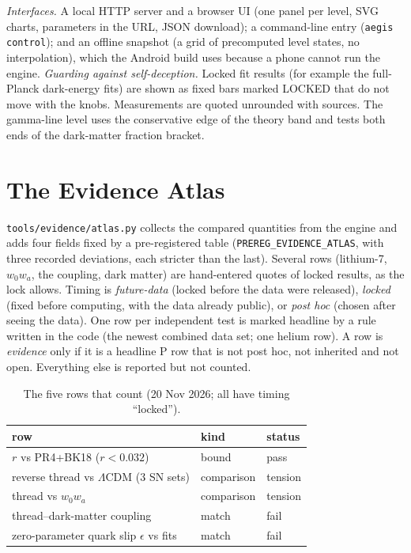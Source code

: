 \documentclass[aps,prd,twocolumn,superscriptaddress,nofootinbib,showkeys]{revtex4-2}
\begin{document}
\textit{Interfaces.} A local HTTP server and a browser UI (one panel per level, SVG charts, parameters in the URL, JSON download); a command-line entry (\texttt{aegis control}); and an offline snapshot (a grid of precomputed level states, no interpolation), which the Android build uses because a phone cannot run the engine.
\textit{Guarding against self-deception.} Locked fit results (for example the full-Planck dark-energy fits) are shown as fixed bars marked LOCKED that do not move with the knobs. Measurements are quoted unrounded with sources. The gamma-line level uses the conservative edge of the theory band and tests both ends of the dark-matter fraction bracket.

\section{The Evidence Atlas}
\texttt{tools/evidence/atlas.py} collects the compared quantities from the engine and adds four fields fixed by a pre-registered table (\texttt{PREREG\_EVIDENCE\_ATLAS}, with three recorded deviations, each stricter than the last). Several rows (lithium-7, $w_0w_a$, the coupling, dark matter) are hand-entered quotes of locked results, as the lock allows. Timing is \emph{future-data} (locked before the data were released), \emph{locked} (fixed before computing, with the data already public), or \emph{post hoc} (chosen after seeing the data). One row per independent test is marked headline by a rule written in the code (the newest combined data set; one helium row). A row is \emph{evidence} only if it is a headline P row that is not post hoc, not inherited and not open. Everything else is reported but not counted.
\begin{table}[t]
\caption{\label{tab:ev}The five rows that count (20 Nov 2026; all have timing ``locked'').}
\begin{ruledtabular}\begin{tabular}{lll}
row & kind & status\\ \hline
$r$ vs PR4+BK18 ($r<0.032$) & bound & pass\\
reverse thread vs $\Lambda$CDM (3 SN sets) & comparison & tension\\
thread vs $w_0w_a$ & comparison & tension\\
thread--dark-matter coupling & match & fail\\
zero-parameter quark slip $\epsilon$ vs fits & match & fail\\
\end{tabular}\end{ruledtabular}
\end{table}
\end{document}
